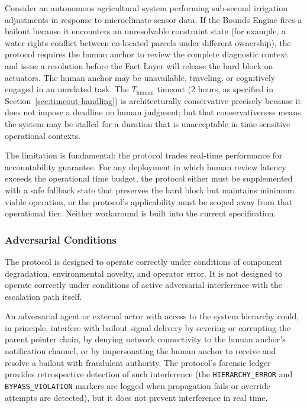 \documentclass[12pt]{article}
\begin{document}
Consider an autonomous agricultural system performing sub-second irrigation adjustments in response to microclimate sensor data. If the Bounds Engine fires a bailout because it encounters an unresolvable constraint state (for example, a water rights conflict between co-located parcels under different ownership), the protocol requires the human anchor to review the complete diagnostic context and issue a resolution before the Fact Layer will release the hard block on actuators. The human anchor may be unavailable, traveling, or cognitively engaged in an unrelated task. The $T_{\text{human}}$ timeout (2 hours, as specified in Section~\ref{sec:timeout-handling}) is architecturally conservative precisely because it does not impose a deadline on human judgment; but that conservativeness means the system may be stalled for a duration that is unacceptable in time-sensitive operational contexts.

The limitation is fundamental: the protocol trades real-time performance for accountability guarantee. For any deployment in which human review latency exceeds the operational time budget, the protocol either must be supplemented with a safe fallback state that preserves the hard block but maintains minimum viable operation, or the protocol's applicability must be scoped away from that operational tier. Neither workaround is built into the current specification.

\subsubsection{Adversarial Conditions}\label{sec:adversarial-conditions}

The protocol is designed to operate correctly under conditions of component degradation, environmental novelty, and operator error. It is not designed to operate correctly under conditions of active adversarial interference with the escalation path itself.

An adversarial agent or external actor with access to the system hierarchy could, in principle, interfere with bailout signal delivery by severing or corrupting the parent pointer chain, by denying network connectivity to the human anchor's notification channel, or by impersonating the human anchor to receive and resolve a bailout with fraudulent authority. The protocol's forensic ledger provides retrospective detection of such interference (the \texttt{HIERARCHY\_ERROR} and \texttt{BYPASS\_VIOLATION} markers are logged when propagation fails or override attempts are detected), but it does not prevent interference in real time.
\end{document}
